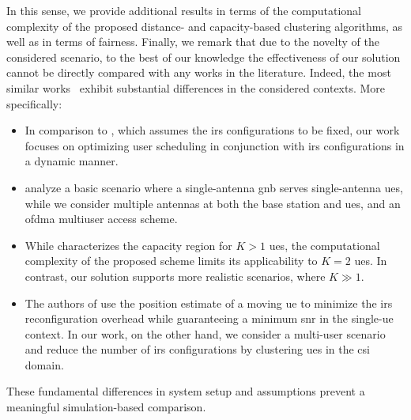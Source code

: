 In this sense, we provide additional results in terms of the computational complexity of the proposed distance- and capacity-based clustering algorithms, as well as in terms of fairness.
Finally, we remark that due to the novelty of the considered scenario, 
to the best of our knowledge the effectiveness of our solution cannot be directly compared with any works in the literature. Indeed, the most similar works~\cite{Lee23Harmony,guo2021intelligent, mu2021capacity,jamali2022low} exhibit substantial differences in the considered contexts.
More specifically:
\begin{itemize}
\item In comparison to \cite{Lee23Harmony}, which assumes the \gls{irs} configurations to be fixed, %
our work focuses on optimizing user scheduling in conjunction with \gls{irs} configurations in a dynamic manner. %
\item \cite{guo2021intelligent, mu2021capacity} analyze a basic scenario where a single-antenna \gls{gnb} serves single-antenna \glspl{ue}, while we consider multiple antennas at both the base station and \glspl{ue}, and an \gls{ofdma} multiuser access scheme. 
\item %
While \cite{mu2021capacity} characterizes the capacity region for %
$K>1$ \glspl{ue}, the computational complexity of the proposed scheme limits its applicability to $K=2$ \glspl{ue}. In contrast, our solution supports more realistic scenarios, where $K \gg 1$.
\item The authors of \cite{jamali2022low} use the position estimate of a moving \gls{ue} to minimize the \gls{irs} reconfiguration overhead while guaranteeing a minimum \gls{snr} in the single-\gls{ue} context. In our work, on the other hand, 
we consider a multi-user scenario and reduce the number of \gls{irs} configurations by clustering \glspl{ue} in the \gls{csi} domain.
\end{itemize}
These fundamental differences in system setup and assumptions prevent a meaningful simulation-based comparison.

